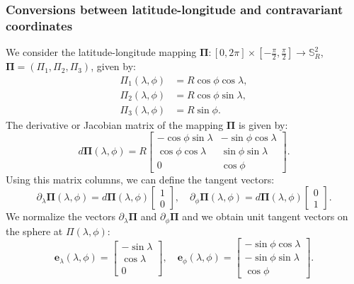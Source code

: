 \subsubsection{Conversions between latitude-longitude and contravariant coordinates}
\label{anexo-sph-ll}
We consider the latitude-longitude mapping 
$\boldsymbol{\Pi}: [0,2\pi] \times [-\frac{\pi}{2},\frac{\pi}{2}] \to \mathbb{S}^2_R$, 
$\boldsymbol{\Pi} = ({\Pi}_1,{\Pi}_2,{\Pi}_3)$, given by:
\begin{align}
	\label{ll2sph}
	{\Pi}_1(\lambda,\phi) &= R\cos \phi \cos \lambda,\\
	{\Pi}_2(\lambda,\phi) &= R\cos \phi \sin \lambda,\\
	{\Pi}_3(\lambda,\phi) &= R\sin \phi.
\end{align}
The derivative or Jacobian matrix of the mapping $\boldsymbol{\Pi}$ is given by:
\begin{equation}
	\label{dGamma}
	d\boldsymbol{\Pi} (\lambda,\phi) = 
	R \begin{bmatrix}
		-\cos \phi \sin \lambda &  -\sin \phi \cos \lambda \\
		\cos \phi \cos \lambda & \sin \phi \sin \lambda \\
		0  &  \cos \phi
	\end{bmatrix}.
\end{equation}
Using this matrix columns, we can define the tangent vectors:
\begin{equation}
	\partial_{\lambda}\boldsymbol{\Pi}(\lambda,\phi) = d\boldsymbol{\Pi}(\lambda,\phi)
	\begin{bmatrix}
		1 \\
		0
	\end{bmatrix}, \quad
	\partial_{\phi}\boldsymbol{\Pi}(\lambda,\phi) = d\boldsymbol{\Pi}(\lambda,\phi)
	\begin{bmatrix}
		0 \\
		1
	\end{bmatrix}.
\end{equation}
We normalize the vectors $\partial_{\lambda}\boldsymbol{\Pi}$ and $\partial_{\phi}\boldsymbol{\Pi}$
and we obtain unit tangent vectors on the sphere at $\Pi(\lambda, \phi)$:
\begin{equation}
	\label{latlon_tg_vectors}
	\boldsymbol{e}_{\lambda}(\lambda,\phi) = 
	\begin{bmatrix}
		-\sin \lambda \\
		\cos \lambda \\
		0
	\end{bmatrix}, \quad
	\boldsymbol{e}_{\phi}(\lambda,\phi) =
	\begin{bmatrix}
		-\sin \phi \cos \lambda \\
		-\sin \phi \sin \lambda \\
		\cos \phi
	\end{bmatrix}.
\end{equation}
